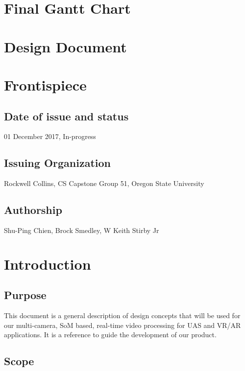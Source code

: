 \documentclass[letterpaper,10pt,serif,draftclsnofoot,onecolumn,compsoc,titlepage]{IEEEtran}
\begin{document}
\section{Final Gantt Chart}

\newpage 

\section{Design Document}
\section{Frontispiece}

\subsection{Date of issue and status}

01 December 2017, In-progress \\

\subsection{Issuing Organization}

Rockwell Collins, CS Capstone Group 51, Oregon State University \\

\subsection{Authorship}

Shu-Ping Chien, Brock Smedley, W Keith Stirby Jr \\

\section{Introduction}

\subsection{Purpose}

This document is a general description of design concepts that will be used for our 
multi-camera, SoM based, real-time video processing for UAS and VR/AR applications. 
It is a reference to guide the development of our product.  \\

\subsection{Scope}
\end{document}
